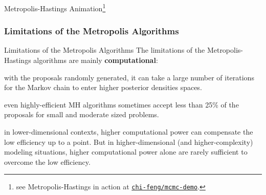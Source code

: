 \begin{frame}{Metropolis-Hastings Animation\footnote{see Metropolis-Hastings in action at \href{https://chi-feng.github.io/mcmc-demo/app.html?algorithm=RandomWalkMH&target=banana}{\texttt{chi-feng/mcmc-demo}}.}}
	\centering
\end{frame}

\subsubsection{Limitations of the Metropolis Algorithms}
\begin{frame}{Limitations of the Metropolis Algorithms}
	The limitations of the Metropolis-Hastings algorithms are mainly \textbf{computational}:
	\begin{vfilleditems}
		\item with the proposals randomly generated,
		it can take a large number of iterations for the
		Markov chain to enter higher posterior densities spaces.
		\item even highly-efficient MH algorithms sometimes accept less than
		25\% of the proposals \parencite{robertsWeakConvergenceOptimal1997, beskosOptimalTuningHybrid2013} for small and moderate sized problems.
		\item in lower-dimensional contexts, higher computational power can compensate the low efficiency up to a point.
		But in higher-dimensional (and higher-complexity) modeling situations,
		higher computational power alone are rarely sufficient to overcome the low efficiency.
	\end{vfilleditems}
\end{frame}



